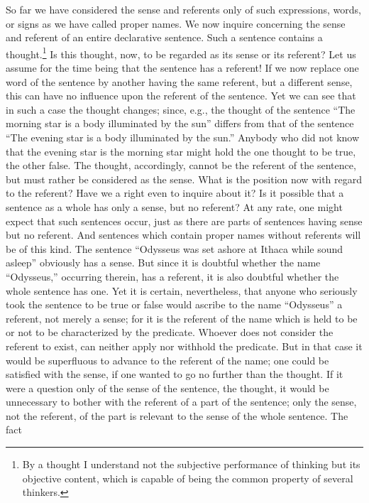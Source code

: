\documentclass[twoside,12pt,a4paper]{article}
\begin{document}
So far we have considered the sense and referents only of such
expressions, words, or signs as we have called proper names. We now
inquire concerning the sense and referent of an entire declarative
sentence. Such a sentence contains a thought.\footnote[5]{By a thought
  I understand not the subjective performance of thinking but its
  objective content, which is capable of being the common property of
  several thinkers.} Is this thought, now, to be regarded as its sense
or its referent? Let us assume for the time being that the sentence
has a referent! If we now replace one word of the sentence by another
having the same referent, but a different sense, this can have no
influence upon the referent of the sentence. Yet we can see that in
such a case the thought changes; since, e.g., the thought of the
sentence ``The morning star is a body illuminated by the sun'' differs
from that of the sentence ``The evening star is a body illuminated by
the sun.'' Anybody who did not know that the evening star is the
morning star might hold the one thought to be true, the other false.
The thought, accordingly, cannot be the referent of the sentence, but
must rather be considered as the sense. What is the position now with
regard to the referent? Have we a right even to inquire about it? Is
it possible that a sentence as a whole has only a sense, but no
referent? At any rate, one might expect that such sentences occur,
just as there are parts of sentences having sense but no referent. And
sentences which contain proper names without referents will be of this
kind. The sentence ``Odysseus was set ashore at Ithaca while sound
asleep'' obviously has a sense. But since it is doubtful whether the
name ``Odysseus,'' occurring therein, has a referent, it is also
doubtful whether the whole sentence has one. Yet it is certain,
nevertheless, that anyone who seriously took the sentence to be true
or false would ascribe to the name ``Odysseus'' a referent, not merely
a sense; for it is the referent of the name which is held to be or not
to be characterized by the predicate. Whoever does not consider the
referent to exist, can neither apply nor withhold the predicate. But
in that case it would be superfluous to advance to the referent of the
name; one could be satisfied with the sense, if one wanted to go no
further than the thought. If it were a question only of the sense of
the sentence, the thought, it would be unnecessary to bother with the
referent of a part of the sentence; only the sense, not the referent,
of the part is relevant to the sense of the whole sentence. The fact
\end{document}
